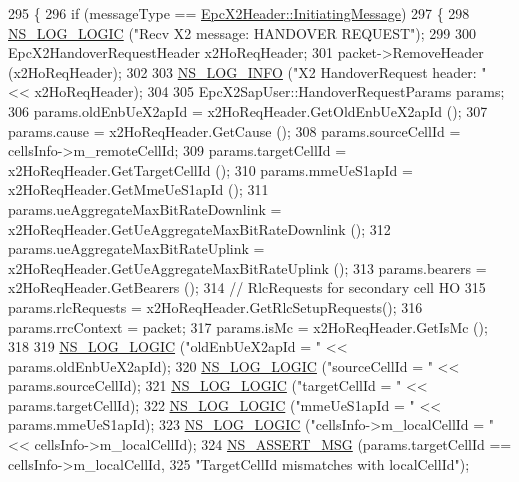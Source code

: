 \begin{DoxyCode}
295     \{
296       \textcolor{keywordflow}{if} (messageType == \hyperlink{classns3_1_1EpcX2Header_a0e69b043a20eaee4c570f223f4eca715a5761e50c3c1918a44e3a5ebc86f17435}{EpcX2Header::InitiatingMessage})
297         \{
298           \hyperlink{group__logging_ga88acd260151caf2db9c0fc84997f45ce}{NS\_LOG\_LOGIC} (\textcolor{stringliteral}{"Recv X2 message: HANDOVER REQUEST"});
299 
300           EpcX2HandoverRequestHeader x2HoReqHeader;
301           packet->RemoveHeader (x2HoReqHeader);
302 
303           \hyperlink{group__logging_gafbd73ee2cf9f26b319f49086d8e860fb}{NS\_LOG\_INFO} (\textcolor{stringliteral}{"X2 HandoverRequest header: "} << x2HoReqHeader);
304 
305           EpcX2SapUser::HandoverRequestParams params;
306           params.oldEnbUeX2apId = x2HoReqHeader.GetOldEnbUeX2apId ();
307           params.cause          = x2HoReqHeader.GetCause ();
308           params.sourceCellId   = cellsInfo->m\_remoteCellId;
309           params.targetCellId   = x2HoReqHeader.GetTargetCellId ();
310           params.mmeUeS1apId    = x2HoReqHeader.GetMmeUeS1apId ();
311           params.ueAggregateMaxBitRateDownlink = x2HoReqHeader.GetUeAggregateMaxBitRateDownlink ();
312           params.ueAggregateMaxBitRateUplink   = x2HoReqHeader.GetUeAggregateMaxBitRateUplink ();
313           params.bearers        = x2HoReqHeader.GetBearers ();
314           \textcolor{comment}{// RlcRequests for secondary cell HO}
315           params.rlcRequests    = x2HoReqHeader.GetRlcSetupRequests();
316           params.rrcContext     = packet;
317           params.isMc           = x2HoReqHeader.GetIsMc ();
318 
319           \hyperlink{group__logging_ga88acd260151caf2db9c0fc84997f45ce}{NS\_LOG\_LOGIC} (\textcolor{stringliteral}{"oldEnbUeX2apId = "} << params.oldEnbUeX2apId);
320           \hyperlink{group__logging_ga88acd260151caf2db9c0fc84997f45ce}{NS\_LOG\_LOGIC} (\textcolor{stringliteral}{"sourceCellId = "} << params.sourceCellId);
321           \hyperlink{group__logging_ga88acd260151caf2db9c0fc84997f45ce}{NS\_LOG\_LOGIC} (\textcolor{stringliteral}{"targetCellId = "} << params.targetCellId);
322           \hyperlink{group__logging_ga88acd260151caf2db9c0fc84997f45ce}{NS\_LOG\_LOGIC} (\textcolor{stringliteral}{"mmeUeS1apId = "} << params.mmeUeS1apId);
323           \hyperlink{group__logging_ga88acd260151caf2db9c0fc84997f45ce}{NS\_LOG\_LOGIC} (\textcolor{stringliteral}{"cellsInfo->m\_localCellId = "} << cellsInfo->m\_localCellId);
324           \hyperlink{assert_8h_aff5ece9066c74e681e74999856f08539}{NS\_ASSERT\_MSG} (params.targetCellId == cellsInfo->m\_localCellId,
325                          \textcolor{stringliteral}{"TargetCellId mismatches with localCellId"});

\end{DoxyCode}
